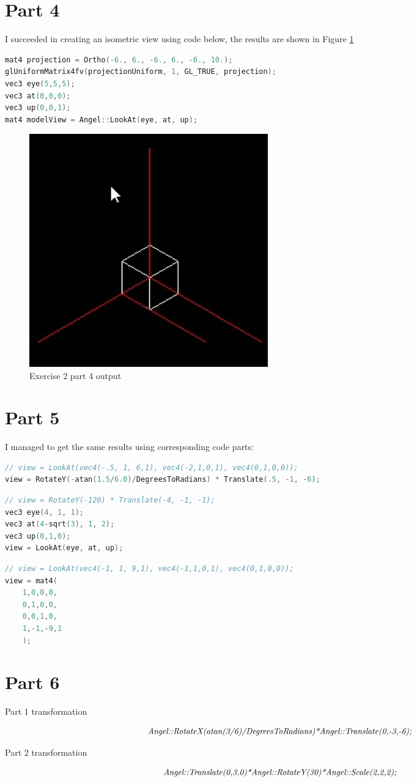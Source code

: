 \section{Part 4}
I succeeded in creating an isometric view using code below, the results are shown in Figure \ref{fig:exercise_2_part_4}
\begin{lstlisting}[language=cpp, caption={Front perspective projection}]
mat4 projection = Ortho(-6., 6., -6., 6., -6., 10.);
glUniformMatrix4fv(projectionUniform, 1, GL_TRUE, projection);
vec3 eye(5,5,5);
vec3 at(0,0,0);
vec3 up(0,0,1);
mat4 modelView = Angel::LookAt(eye, at, up);
\end{lstlisting}
\begin{figure}[ht!]
	\begin{center}
		\includegraphics[width=0.5\textwidth]{figures/exercise_2_part_4}
	\end{center}
	\caption{Exercise 2 part 4 output}
	\label{fig:exercise_2_part_4} 
\end{figure}



\section{Part 5}
I managed to get the same results using corresponding code parts:
\begin{lstlisting}[language=cpp, caption={Rotation and translation 1}]
// view = LookAt(vec4(-.5, 1, 6,1), vec4(-2,1,0,1), vec4(0,1,0,0));
view = RotateY(-atan(1.5/6.0)/DegreesToRadians) * Translate(.5, -1, -6);
\end{lstlisting}
\begin{lstlisting}[language=cpp, caption={Rotation and translation 2}]
// view = RotateY(-120) * Translate(-4, -1, -1);
vec3 eye(4, 1, 1);
vec3 at(4-sqrt(3), 1, 2);
vec3 up(0,1,0);
view = LookAt(eye, at, up);
\end{lstlisting}
\begin{lstlisting}[language=cpp, caption={Rotation and translation 3}]
// view = LookAt(vec4(-1, 1, 9,1), vec4(-1,1,0,1), vec4(0,1,0,0));
view = mat4(
	1,0,0,0,
	0,1,0,0,
	0,0,1,0,
	1,-1,-9,1
	);
\end{lstlisting}


\section{Part 6}
\begin{description}
  \item[Part 1 transformation]
  	$$\emph{Angel::RotateX(atan(3/6)/DegreesToRadians)*Angel::Translate(0,-3,-6);}$$
  \item[Part 2 transformation]
  	$$\emph{Angel::Translate(0,3,0)*Angel::RotateY(30)*Angel::Scale(2,2,2);}$$
\end{description}
